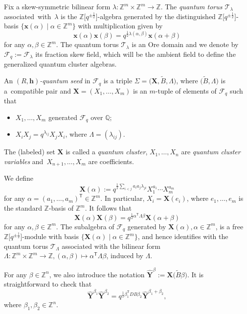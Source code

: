 \documentclass[10pt,a4paper]{amsart}
\newcommand{\Z}{\mathbb{Z}}
\numberwithin{equation}{section}
\begin{document}
 Fix a skew-symmetric bilinear form $\lambda\colon\mathbb{Z}^{m}\times \mathbb{Z}^m\to \mathbb{Z}$. The {\it quantum torus $\mathcal{T}_\lambda$} associated~with~$\lambda$ is the $\mathbb{Z}\big[q^{\pm\frac{1}{2}}\big]$-algebra generated by the distinguished $\mathbb{Z}\big[q^{\pm\frac{1}{2}}\big]$-basis $\{\mathbf{x}(\alpha)\mid \alpha\in \mathbb{Z}^m\}$ with multiplication given by
\[
\mathbf{x}(\alpha)\mathbf{x}(\beta)=q^{\frac{1}{2}\lambda(\alpha,\beta)}\mathbf{x}(\alpha+\beta)
\]
for any $\alpha,\beta\in \mathbb{Z}^m$. The quantum torus $\mathcal{T}_\lambda$ is an Ore domain and we denote by $\mathcal{F}_q:=\mathcal{F}_\lambda$ its fraction skew field, which will be the ambient field to define the generalized quantum cluster algebras.
\begin{Definition}
 An {\it $(R,\mathbf{h})$-quantum seed} in $\mathcal{F}_q$ is a triple $\Sigma=\bigl(\mathbf{X},\tilde{B},\Lambda\bigr)$, where $\bigl(\tilde{B},\Lambda\bigr)$ is a~compatible pair and $\mathbf{X}=(X_1,\dots, X_m)$ is an $m$-tuple of elements of $\mathcal{F}_q$ such that
 \begin{itemize}\itemsep=0pt
 \item $X_1,\dots, X_{m}$ generated $\mathcal{F}_q$ over $\mathbb{Q}$;
 \item $X_iX_j=q^{\lambda_{ij}}X_jX_i$, where $\Lambda=(\lambda_{ij})$.
 \end{itemize}
 The (labeled) set $\mathbf{X}$ is called a {\it quantum cluster}, $X_1,\dots, X_n$ are {\it quantum cluster variables} and~${X_{n+1},\dots, X_m}$ are coefficients.
\end{Definition}
We define \[\mathbf{X}(\alpha):=q^{\frac{1}{2}\sum_{i<j}a_ia_j\lambda_{ji}}X_1^{a_1}\cdots X_{m}^{a_{m}}\] for any $\alpha=(a_1,\dots, a_{m})^{\mathsf T}\in \mathbb{Z}^{m}$. In particular, $X_i=\mathbf{X}(e_i)$, where $e_1,\dots, e_m$ is the standard $\Z$-basis of $\Z^m$.
It follows that
 \[
 \mathbf{X}(\alpha) \mathbf{X}(\beta)=q^{\frac{1}{2}\alpha^{\mathsf T}\Lambda \beta}\mathbf{X}({\alpha+\beta})
 \]
 for any $\alpha,\beta\in \Z^{m}$. The subalgebra of $\mathcal{F}_q$ generated by $\mathbf{X}(\alpha), \alpha\in \Z^{m}$, is a free $\Z\big[q^{\pm\frac{1}{2}}\big]$-module with basis $\{\mathbf{X}(\alpha) \mid \alpha\in \Z^{m}\}$, and hence identifies with the quantum torus $\mathcal{T}_\Lambda$ associated with the bilinear form $\Lambda\colon\Z^m\times \Z^m\to \Z, (\alpha,\beta)\mapsto \alpha^{\mathsf T}\Lambda \beta$, induced by $\Lambda$.

 For any $\beta\in \Z^n$, we also introduce the notation
$
 \hat{\mathbf{Y}}^{\beta}:=\mathbf{X}\bigl(\tilde{B}\beta\bigr)$.
 It is straightforward to check that
 \[
 \hat{\mathbf{Y}}^{\beta_1}\hat{\mathbf{Y}}^{\beta_2}=q^{\frac{1}{2}\beta_1^{\mathsf T}DB\beta_2}\hat{\mathbf{Y}}^{\beta_1+\beta_2},
 \]
 where $\beta_1,\beta_2\in \Z^n$.
\end{document}
